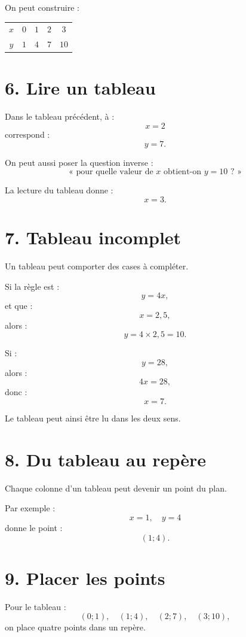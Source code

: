 On peut construire :

\begin{tabular}{c|c|c|c|c}
$x$ & $0$ & $1$ & $2$ & $3$ \\
$y$ & $1$ & $4$ & $7$ & $10$ \\
\end{tabular}

\section{6. Lire un tableau}

Dans le tableau précédent, à :
\[
x=2
\]
correspond :
\[
y=7.
\]

On peut aussi poser la question inverse :
\[
\text{« pour quelle valeur de }x\text{ obtient-on }y=10\text{ ? »}
\]

La lecture du tableau donne :
\[
x=3.
\]

\section{7. Tableau incomplet}

Un tableau peut comporter des cases à compléter.

Si la règle est :
\[
y=4x,
\]
et que :
\[
x=2{,}5,
\]
alors :
\[
y=4\times2{,}5=10.
\]

Si :
\[
y=28,
\]
alors :
\[
4x=28,
\]
donc :
\[
x=7.
\]

Le tableau peut ainsi être lu dans les deux sens.

\section{8. Du tableau au repère}

Chaque colonne d'un tableau peut devenir un point du plan.

Par exemple :
\[
x=1,\quad y=4
\]
donne le point :
\[
(1;4).
\]


\section{9. Placer les points}

Pour le tableau :
\[
(0;1),\quad(1;4),\quad(2;7),\quad(3;10),
\]
on place quatre points dans un repère.

